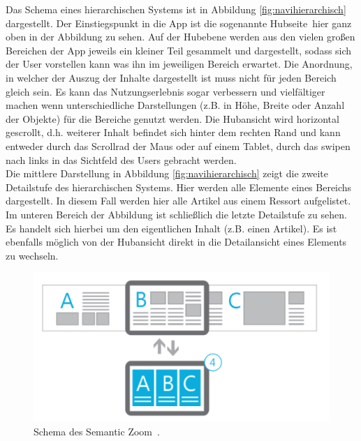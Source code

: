 \documentclass[12pt,a4paper]{scrartcl}
\begin{document}
Das Schema eines hierarchischen Systems ist in Abbildung \ref{fig:navihierarchisch} dargestellt. Der Einstiegspunkt in die App ist die sogenannte \glqq Hubseite\grqq\, hier ganz oben in der Abbildung zu sehen. Auf der Hubebene werden aus den vielen großen Bereichen der App jeweils ein kleiner Teil gesammelt und dargestellt, sodass sich der User vorstellen kann was ihn im jeweiligen Bereich erwartet. Die Anordnung, in welcher der Auszug der Inhalte dargestellt ist muss nicht für jeden Bereich gleich sein. Es kann das Nutzungserlebnis sogar verbessern und vielfältiger machen wenn unterschiedliche Darstellungen (z.B. in Höhe, Breite oder Anzahl der Objekte) für die Bereiche genutzt werden. Die Hubansicht wird horizontal gescrollt, d.h. weiterer Inhalt befindet sich hinter dem rechten Rand und kann entweder durch das Scrollrad der Maus oder auf einem Tablet, durch das swipen nach links in das Sichtfeld des Users gebracht werden.\\
Die mittlere Darstellung in Abbildung \ref{fig:navihierarchisch} zeigt die zweite Detailstufe des hierarchischen Systems. Hier werden alle Elemente eines Bereichs dargestellt. In diesem Fall werden hier alle Artikel aus einem Ressort aufgelistet.\\
Im unteren Bereich der Abbildung ist schließlich die letzte Detailstufe zu sehen. Es handelt sich hierbei um den eigentlichen Inhalt (z.B. einen Artikel). Es ist ebenfalls möglich von der Hubansicht direkt in die Detailansicht eines Elements zu wechseln.  

\begin{figure}[h]	
	\centering
	\includegraphics[scale=1]{Bilder/Abbildungen/ms_navigation_hierarchie_semantic_zoom} 
	\caption{Schema des \glqq Semantic Zoom\grqq\ \protect\citep{MicrosoftNavidesign2013}.}
	\label{fig:semanticzoom}
\end{figure}
\end{document}

